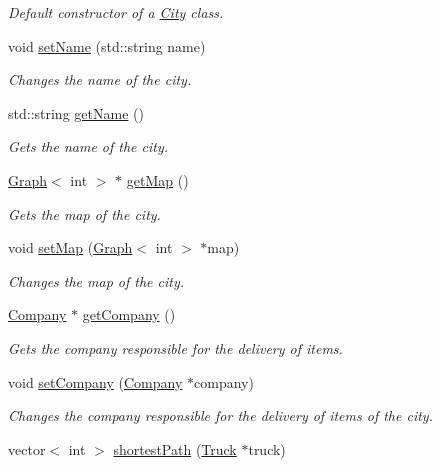 \begin{DoxyCompactItemize}
\begin{DoxyCompactList}\small\item\em Default constructor of a \hyperlink{class_city}{City} class. \end{DoxyCompactList}\item 
void \hyperlink{class_city_a1b0da34ae1fa07bd3223e1917f5311fd}{set\+Name} (std\+::string name)
\begin{DoxyCompactList}\small\item\em Changes the name of the city. \end{DoxyCompactList}\item 
std\+::string \hyperlink{class_city_adc7fe5313b3572973918cf6385e87fd5}{get\+Name} ()
\begin{DoxyCompactList}\small\item\em Gets the name of the city. \end{DoxyCompactList}\item 
\hyperlink{class_graph}{Graph}$<$ int $>$ $\ast$ \hyperlink{class_city_a8f3f47c5bd299d98a3265f824472b86d}{get\+Map} ()
\begin{DoxyCompactList}\small\item\em Gets the map of the city. \end{DoxyCompactList}\item 
void \hyperlink{class_city_aa894bfe97bd2385ee6ebc300fe0a2b4d}{set\+Map} (\hyperlink{class_graph}{Graph}$<$ int $>$ $\ast$map)
\begin{DoxyCompactList}\small\item\em Changes the map of the city. \end{DoxyCompactList}\item 
\hyperlink{class_company}{Company} $\ast$ \hyperlink{class_city_a9f98c84945631205f016710d7e2a4920}{get\+Company} ()
\begin{DoxyCompactList}\small\item\em Gets the company responsible for the delivery of items. \end{DoxyCompactList}\item 
void \hyperlink{class_city_a18e4679f6b4f29f4224ad2a00878b518}{set\+Company} (\hyperlink{class_company}{Company} $\ast$company)
\begin{DoxyCompactList}\small\item\em Changes the company responsible for the delivery of items of the city. \end{DoxyCompactList}\item 
vector$<$ int $>$ \hyperlink{class_city_af2fabccb1a1b135d164a3a13836e0ccb}{shortest\+Path} (\hyperlink{class_truck}{Truck} $\ast$truck)

\end{DoxyCompactItemize}
